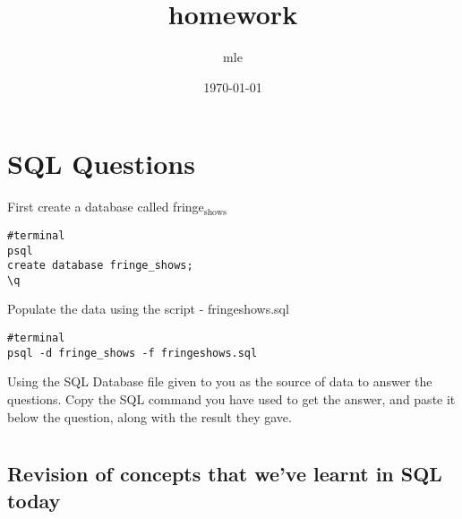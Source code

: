 \documentclass[11pt]{article}
\author{mle}
\date{\today}
\title{homework}
\begin{document}
\maketitle
\tableofcontents

\section{SQL Questions}
\label{sec-1}

First create a database called fringe$_{\text{shows}}$
\begin{verbatim}
#terminal
psql
create database fringe_shows;
\q
\end{verbatim}
Populate the data using the script - fringeshows.sql
\begin{verbatim}
#terminal
psql -d fringe_shows -f fringeshows.sql
\end{verbatim}
Using the SQL Database file given to you as the source of data to answer
the questions. Copy the SQL command you have used to get the answer, and
paste it below the question, along with the result they gave.

\section{}
\label{sec-2}

\subsection{Revision of concepts that we've learnt in SQL today}
\label{sec-2-1}
\end{document}
